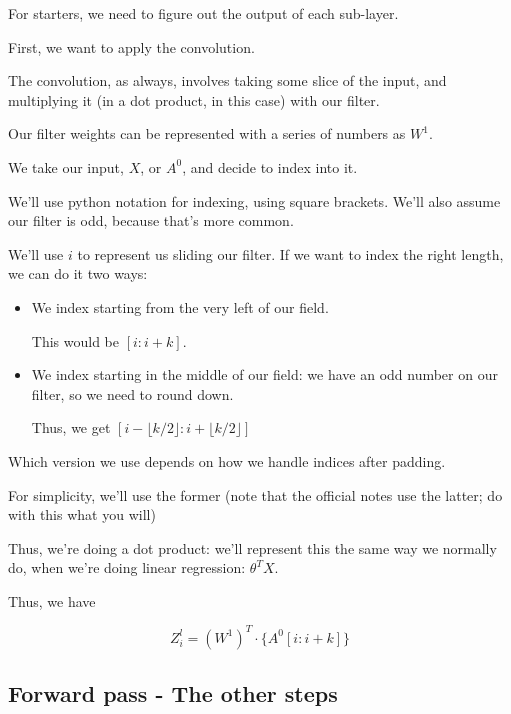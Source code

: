         For starters, we need to figure out the output of each sub-layer.
        
        First, we want to apply the convolution.
        
        The convolution, as always, involves taking some slice of the input, and multiplying it (in a dot product, in this case) with our filter.
        
        Our filter weights can be represented with a series of numbers as $W^1$.
        
        We take our input, $X$, or $A^0$, and decide to index into it.
        
        We'll use python notation for indexing, using square brackets. We'll also assume our filter is odd, because that's more common. 
        
        We'll use $i$ to represent us sliding our filter. If we want to index the right length, we can do it two ways:
        
        \begin{itemize}
            \item We index starting from the very left of our field.
            
            This would be $[i:i+k]$.
            
            \item We index starting in the middle of our field: we have an odd number on our filter, so we need to round down. 
            
            Thus, we get $[ i- \lfloor k/2 \rfloor : i+ \lfloor k/2 \rfloor ]$
        \end{itemize}
        
        Which version we use depends on how we handle indices after padding.
        
        For simplicity, we'll use the former (note that the official notes use the latter; do with this what you will)
        
        Thus, we're doing a dot product: we'll represent this the same way we normally do, when we're doing linear regression: $\theta^T X$.
        
        Thus, we have
        
        \begin{equation*}
            Z_i^l = (W^1)^T \cdot \{ A^0 [i:i+k] \}
        \end{equation*}
        
    \subsection{Forward pass - The other steps}
    
